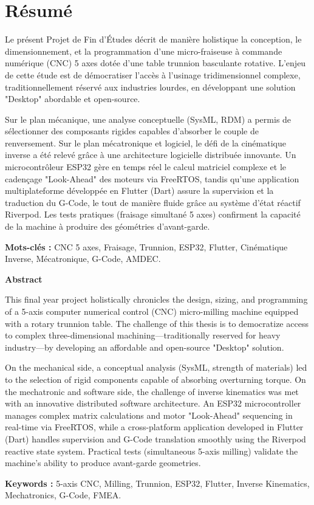 
\chapter*{Résumé}

Le présent Projet de Fin d'Études décrit de manière holistique la conception, le dimensionnement, et la programmation d'une micro-fraiseuse à commande numérique (CNC) 5 axes dotée d'une table trunnion basculante rotative. L'enjeu de cette étude est de démocratiser l'accès à l'usinage tridimensionnel complexe, traditionnellement réservé aux industries lourdes, en développant une solution "Desktop" abordable et open-source.

Sur le plan mécanique, une analyse conceptuelle (SysML, RDM) a permis de sélectionner des composants rigides capables d'absorber le couple de renversement. Sur le plan mécatronique et logiciel, le défi de la cinématique inverse a été relevé grâce à une architecture logicielle distribuée innovante. Un microcontrôleur ESP32 gère en temps réel le calcul matriciel complexe et le cadençage "Look-Ahead" des moteurs via FreeRTOS, tandis qu'une application multiplateforme développée en Flutter (Dart) assure la supervision et la traduction du G-Code, le tout de manière fluide grâce au système d'état réactif Riverpod. Les tests pratiques (fraisage simultané 5 axes) confirment la capacité de la machine à produire des géométries d'avant-garde.

\vspace{0.5cm}
\noindent\textbf{Mots-clés :} CNC 5 axes, Fraisage, Trunnion, ESP32, Flutter, Cinématique Inverse, Mécatronique, G-Code, AMDEC.

\vspace{1.5cm}

\begin{center}
    \textbf{\Large Abstract}
\end{center}

This final year project holistically chronicles the design, sizing, and programming of a 5-axis computer numerical control (CNC) micro-milling machine equipped with a rotary trunnion table. The challenge of this thesis is to democratize access to complex three-dimensional machining—traditionally reserved for heavy industry—by developing an affordable and open-source "Desktop" solution.

On the mechanical side, a conceptual analysis (SysML, strength of materials) led to the selection of rigid components capable of absorbing overturning torque. On the mechatronic and software side, the challenge of inverse kinematics was met with an innovative distributed software architecture. An ESP32 microcontroller manages complex matrix calculations and motor "Look-Ahead" sequencing in real-time via FreeRTOS, while a cross-platform application developed in Flutter (Dart) handles supervision and G-Code translation smoothly using the Riverpod reactive state system. Practical tests (simultaneous 5-axis milling) validate the machine's ability to produce avant-garde geometries.

\vspace{0.5cm}
\noindent\textbf{Keywords :} 5-axis CNC, Milling, Trunnion, ESP32, Flutter, Inverse Kinematics, Mechatronics, G-Code, FMEA.
